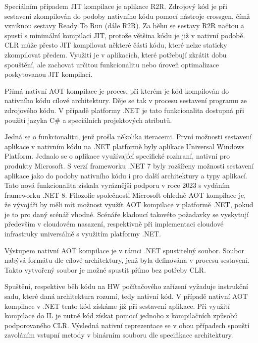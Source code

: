 Speciálním případem JIT kompilace je aplikace R2R. Zdrojový kód je při sestavení zkompilován do podoby nativního kódu pomocí nástroje crossgen, čímž vzniknou sestavy Ready To Run (dále R2R). Za běhu se sestavy R2R načtou a spustí s minimální kompilací JIT, protože většina kódu je již v nativní podobě. CLR může přesto JIT kompilovat některé části kódu, které nelze staticky zkompilovat předem. Využití je v aplikacích, které potřebují zkrátit dobu spouštění, ale zachovat určitou funkcionalitu nebo úroveň optimalizace poskytovanou JIT kompilací.


Přímá nativní AOT kompilace je proces, při kterém je kód kompilován do nativního kódu cílové architektury. Děje se tak v procesu sestavení programu ze zdrojového kódu. V případě platformy .NET je tato funkcionalita dostupná při použití jazyka C\# a speciálních projektových atributů. 

Jedná se o funkcionalitu, jenž prošla několika iteracemi. První možnosti sestavení aplikace v nativním kódu na .NET platformě byly aplikace Universal Windows Platform. Jednalo se o aplikace využívající specifické rozhraní, nativní pro produkty Microsoft. S verzí frameworku .NET 7 byly rozšířeny možnosti sestavení aplikace jako do podoby nativního kódu i pro další architektury a typy aplikací. Tato nová funkcionalita získala vyráznější podporu v roce 2023 s vydáním frameworku .NET 8. Filozofie společnosti Microsoft ohledně AOT kompilace je, že vývojáři by měli mít možnost využít AOT kompilace v platformě .NET, pokud je to pro daný scénář vhodné. Scénáře kladoucí takovéto požadavky se vyskytují především v cloudovém nasazení, respektivně při implementaci cloudové infrastruky universálně s využitím platformy .NET. \cite{Pflug2023}

Výstupem nativní AOT kompilace je v rámci .NET spustitelný soubor. Soubor nabývá formátu dle cílové architektury, jenž byla definována v procesu sestavení. Takto vytvořený soubor je možné spustit přímo bez potřeby CLR.


Spuštění, respektive běh kódu na HW počítačového zařízení vyžaduje instrukční sadu, které daná architektura rozumí, tedy nativní kód. V případě nativní AOT kompilace v .NET tento kód získáme již při sestavení aplikace. Při využití kompilace do IL je nutné kód získat pomocí jednoho z kompilačních způsobů podporovaného CLR. Výsledná nativní reprezentace se v obou případech spouští zavoláním vstupní metody v binárním souboru dle specifikace architektury.

